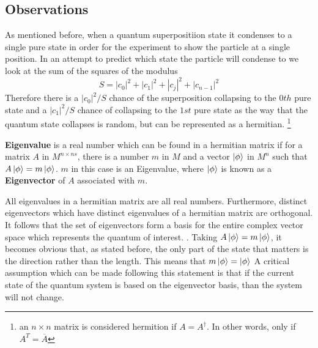 \documentclass[12pt]{article}
\begin{document}
\subsection{Observations}
As mentioned before, when a quantum superpositiion state it condenses to a single pure state in order for the experiment to show the particle at a single position. In an attempt to predict which state the particle will condense to we look at the sum of the squares of the modulus\cite{intro} 
$$S = \left|c_0\right|^2 + \left|c_1\right|^2 + \left|c_{j}\right|^2 +\left|c_{n-1}\right|^2$$ 
Therefore there is a $\left|c_0\right|^2\!/S$ chance of the superposition collapsing to the $0th$ pure state and a $\left|c_1\right|^2\!/S$ chance of collapsing to the $1st$ pure state as the way that the quantum state collapses is random, but can be represented as a hermitian.
\footnote{an $ n\times n $ matrix is considered hermition if $A = A^\dagger $. In other words, only if $ A^T = \overline{A} $}
\par
\textbf{Eigenvalue} is a real number which can be found in a hermitian matrix if for a matrix $A$ in $M^{n\times ns}$, there is a number $m$ in $M$ and a vector $\ket{\phi}$ in $M^n$ such that $A\ket{\phi} = m\ket{\phi}$. $m$ in this case is an Eigenvalue, where $\ket{\phi}$ is known as a \textbf{Eigenvector} of $A$ associated with $m$.\par
All eigenvalues in a hermitian matrix are all real numbers. Furthermore, distinct eigenvectors which have distinct eigenvalues of a hermitian matrix are orthogonal. It follows that the set of eigenvectors form a basis for the entire complex vector space which represents the quantum of interest. \cite{intro}. Taking $A\ket{\phi} = m\ket{\phi}$, it becomes obvious that, as stated before, the only part of the state that matters is the direction rather than the length. This means that $m\ket{\phi} = \ket{\phi}$ A critical assumption which can be made following this statement is that if the current state of the quantum system is based on the eigenvector basis, than the system will not change.
\end{document}
